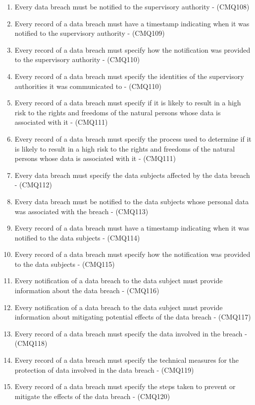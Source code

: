 \begin{enumerate}[label={\textit{C.\theenumi}}]
    \item Every data breach must be notified to the supervisory authority - (CMQ108)
    \item Every record of a data breach must have a timestamp indicating when it was notified to the supervisory authority - (CMQ109)
    \item Every record of a data breach must specify how the notification was provided to the supervisory authority - (CMQ110)
    \item Every record of a data breach must specify the identities of the supervisory authorities it was communicated to - (CMQ110)
    \item Every record of a data breach must specify if it is likely to result in a high risk to the rights and freedoms of the natural persons whose data is associated with it - (CMQ111)
    \item Every record of a data breach must specify the process used to determine if it is likely to result in a high risk to the rights and freedoms of the natural persons whose data is associated with it - (CMQ111)
    \item Every data breach must specify the data subjects affected by the data breach - (CMQ112)
    \item Every data breach must be notified to the data subjects whose personal data was associated with the breach - (CMQ113)
    \item Every record of a data breach must have a timestamp indicating when it was notified to the data subjects - (CMQ114)
    \item Every record of a data breach must specify how the notification was provided to the data subjects - (CMQ115)
    \item Every notification of a data breach to the data subject must provide information about the data breach - (CMQ116)
    \item Every notification of a data breach to the data subject must provide information about mitigating potential effects of the data breach - (CMQ117)
    \item Every record of a data breach must specify the data involved in the breach - (CMQ118)
    \item Every record of a data breach must specify the technical measures for the protection of data involved in the data breach - (CMQ119)
    \item Every record of a data breach must specify the steps taken to prevent or mitigate the effects of the data breach - (CMQ120)
\end{enumerate}

